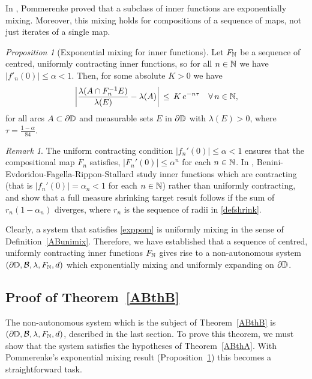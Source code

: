 \documentclass[11pt,reqno]{amsart}
\newcommand{\N}{{\Bbb N}}
\newcommand{\D}{{\Bbb D}}
\newcommand{\0}{\mathbf{0}}
\newtheorem{proposition}{Proposition}
\theoremstyle{remark}
\newtheorem{remark}{{Remark}}
\numberwithin{equation}{section}
\newtheorem{proposition}[theorem]{Proposition}
\theoremstyle{remark}
\newtheorem*{remark}{Remark}
\numberwithin{equation}{section}
\begin{document}
In \cite[Lemma~3]{Pom81},  Pommerenke proved that a subclass of inner functions are exponentially mixing. Moreover, this mixing holds for compositions of a sequence of maps, not just iterates of a single map.
 \begin{proposition}[Exponential mixing for inner functions] \label{expmixcomp}
 Let $F_\N$ be a sequence of centred, uniformly contracting inner functions, so for all $n \in \N$ we have $|f'_n(0)| \leq \alpha <1$. Then, for some absolute $K > 0$ we have
 \begin{equation}\label{exppom}
   \left|\frac{\lambda(A\cap F_n^{-1}E)}{\lambda(E)}-\lambda(A)\right| \,  \le  \,  K \, e^{- n\tau}     \quad  \forall \, n \in \N,
\end{equation}
for all arcs $A \subset \partial\D$ and measurable sets $E$ in $\partial\D$ with $\lambda(E) > 0 $, where $\tau= \frac{1-\alpha}{84} $.
 \end{proposition}
\begin{remark}
The uniform contracting condition $|f_n'(0)| \leq \alpha<1$  ensures that the compositional map $F_n$ satisfies, $|F_n'(0)| \leq \alpha ^n$ for each $n \in \N$. In \cite{BERFS}, Benini-Evdoridou-Fagella-Rippon-Stallard study inner functions which are contracting (that is $|f_n'(0)|=\alpha_n <1$ for each $n \in \N$) rather than uniformly contracting, and show that a full measure shrinking target result follows if the sum of $r_n (1-\alpha_n)$ diverges, where $r_n$ is the sequence of radii in \eqref{defshrink}. 
 \end{remark}
Clearly, a system that satisfies \eqref{exppom} is uniformly mixing in the sense of Definition~\ref{ABunimix}. 
Therefore, we have established that a sequence of centred, uniformly contracting inner functions $F_{\N}$ gives rise to a non-autonomous system $(\partial\D, \mathcal{B},\lambda,F_{\N},d)$ which exponentially mixing and uniformly expanding on $\partial \D$.


\subsection{Proof of Theorem~\ref{ABthB}}\label{proofb}
The non-autonomous system which is the subject of Theorem~\ref{ABthB} is $(\partial \D, \mathcal{B},\lambda,F_\N,d)$, described in the last section. To prove this theorem, we must show that the system satisfies the hypotheses of Theorem~\ref{ABthA}. With Pommerenke's exponential mixing result (Proposition~\ref{expmixcomp}) this becomes a straightforward task.
\end{document}
